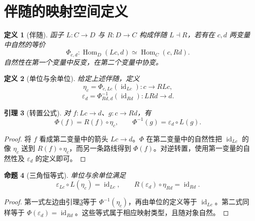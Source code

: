 \documentclass[12pt,oneside,openany,fontset=none]{ctexbook}
\theoremstyle{cn}
\newtheorem{definition}{定义}[chapter]
\newtheorem{lemma}[definition]{引理}
\newtheorem{proposition}[definition]{命题}
\numberwithin{equation}{chapter}
\newcommand{\id}{\operatorname{id}}
\newcommand{\Hom}{\operatorname{Hom}}
\begin{document}
\section{伴随的映射空间定义}
\begin{definition}[伴随]
函子 $L:C\to D$ 与 $R:D\to C$ 构成伴随 $L\dashv R$，若有在 $c,d$ 两变量中自然的等价
\[
\Phi_{c,d}:\Hom_D(Lc,d)\simeq\Hom_C(c,Rd).
\]
自然性在第一个变量中反变，在第二个变量中协变。
\end{definition}
\begin{definition}[单位与余单位]
给定上述伴随，定义
\[
\eta_c=\Phi_{c,Lc}(\id_{Lc}):c\to RLc,
\]
\[
\varepsilon_d=\Phi^{-1}_{Rd,d}(\id_{Rd}):LRd\to d.
\]
\end{definition}
\begin{lemma}[转置公式]\label{lem:transpose}
对 $f:Lc\to d$、$g:c\to Rd$，有
\[
\Phi(f)=R(f)\circ\eta_c,
\qquad
\Phi^{-1}(g)=\varepsilon_d\circ L(g).
\]
\end{lemma}
\begin{proof}
将 $f$ 看成第二变量中的箭头 $Lc\to d$。$\Phi$ 在第二变量中的自然性把 $\id_{Lc}$ 的像 $\eta_c$ 送到 $R(f)\circ\eta_c$，而另一条路线得到 $\Phi(f)$。对逆转置，使用第一变量的自然性及 $\varepsilon_d$ 的定义即可。
\end{proof}
\begin{proposition}[三角恒等式]
单位与余单位满足
\[
\varepsilon_{Lc}\circ L(\eta_c)=\id_{Lc},
\qquad
R(\varepsilon_d)\circ\eta_{Rd}=\id_{Rd}.
\]
\end{proposition}
\begin{proof}
第一式左边由引理\ref{lem:transpose}等于 $\Phi^{-1}(\eta_c)$，再由单位的定义等于 $\id_{Lc}$。第二式同样等于 $\Phi(\varepsilon_d)=\id_{Rd}$。这些等式属于相应映射类型，且随对象自然。
\end{proof}
\end{document}
